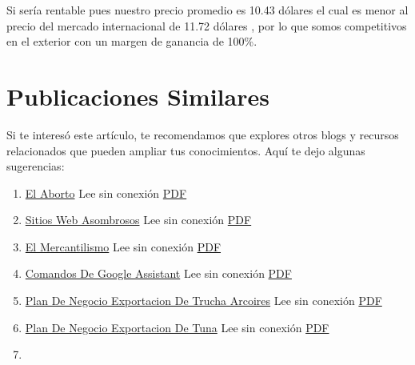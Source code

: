 \documentclass[
  stu,
  floatsintext,
  longtable,
  a4paper,
  nolmodern,
  notxfonts,
  notimes,
  colorlinks=true,linkcolor=blue,citecolor=blue,urlcolor=blue]{apa7}
\providecommand{\tightlist}{%
  \setlength{\itemsep}{0pt}\setlength{\parskip}{0pt}}
\begin{document}
Si sería rentable pues nuestro precio promedio es 10.43 dólares el cual
es menor al precio del mercado internacional de 11.72 dólares , por lo
que somos competitivos en el exterior con un margen de ganancia de
100\%.

\section{Publicaciones Similares}\label{publicaciones-similares}

Si te interesó este artículo, te recomendamos que explores otros blogs y
recursos relacionados que pueden ampliar tus conocimientos. Aquí te dejo
algunas sugerencias:

\begin{enumerate}
\def\labelenumi{\arabic{enumi}.}
\tightlist
\item
  \href{https://achalmaedison.netlify.app/blog/posts/2015-05-14-el-aborto}{El
  Aborto} Lee sin conexión
  \href{https://achalmaedison.netlify.app/blog/posts/2015-05-14-el-aborto/index.pdf}{PDF}
\item
  \href{https://achalmaedison.netlify.app/blog/posts/2017-04-23-sitios-web-asombrosos}{Sitios
  Web Asombrosos} Lee sin conexión
  \href{https://achalmaedison.netlify.app/blog/posts/2017-04-23-sitios-web-asombrosos/index.pdf}{PDF}
\item
  \href{https://achalmaedison.netlify.app/blog/posts/2017-05-23-el-mercantilismo}{El
  Mercantilismo} Lee sin conexión
  \href{https://achalmaedison.netlify.app/blog/posts/2017-05-23-el-mercantilismo/index.pdf}{PDF}
\item
  \href{https://achalmaedison.netlify.app/blog/posts/2020-05-23-comandos-de-google-assistant}{Comandos
  De Google Assistant} Lee sin conexión
  \href{https://achalmaedison.netlify.app/blog/posts/2020-05-23-comandos-de-google-assistant/index.pdf}{PDF}
\item
  \href{https://achalmaedison.netlify.app/blog/posts/2020-09-15-plan-de-negocio-exportacion-de-trucha-arcoires}{Plan
  De Negocio Exportacion De Trucha Arcoires} Lee sin conexión
  \href{https://achalmaedison.netlify.app/blog/posts/2020-09-15-plan-de-negocio-exportacion-de-trucha-arcoires/index.pdf}{PDF}
\item
  \href{https://achalmaedison.netlify.app/blog/posts/2021-07-13-plan-de-negocio-exportacion-de-tuna}{Plan
  De Negocio Exportacion De Tuna} Lee sin conexión
  \href{https://achalmaedison.netlify.app/blog/posts/2021-07-13-plan-de-negocio-exportacion-de-tuna/index.pdf}{PDF}
\item

\end{enumerate}
\end{document}
